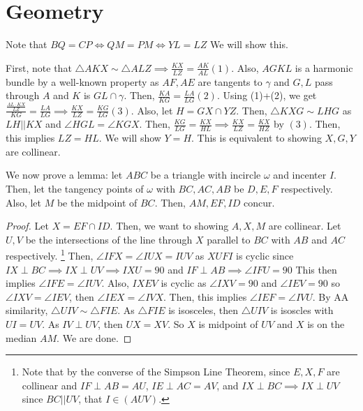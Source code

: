 \documentclass[11pt]{article}
\begin{document}

\setcounter{problem}{0}
\section{Geometry}


\begin{sol} Note that $BQ=CP \iff QM = PM \iff YL = LZ$ We will show this.

First, note that $\triangle AKX \sim \triangle ALZ\implies \frac{KX}{LZ} = \frac{AK}{AL} (1)$. Also, $AGKL$ is a harmonic bundle by a well-known property as $AF, AE$ are tangents to $\gamma$ and $G,L$ pass through $A$ and $K$ is $GL \cap \gamma$. Then, $\frac{KA}{KG} = \frac{LA}{LG}(2)$. Using (1)+(2), we get $\frac{\frac{AL\cdot KX}{LZ}}{KG} = \frac{LA}{LG} \implies \frac{KX}{LZ} = \frac{KG}{LG}(3)$. Also, let $H=GX \cap YZ$. Then, $\triangle KXG \sim LHG$ as $LH||KX$ and $\angle HGL = \angle KGX$. Then, $\frac{KG}{LG}=\frac{KX}{HL} \implies \frac{KX}{LZ } = \frac{KX}{HZ}$ by $(3)$. Then, this implies $LZ=HL$. We will show $Y=H$. This is equivalent to showing $X,G,Y$ are collinear.

We now prove a lemma: let $ABC$ be a triangle with incircle $\omega$ and incenter $I$. Then, let the tangency points of $\omega$ with $BC,AC,AB$ be $D,E,F$ respectively. Also, let $M$ be the midpoint of $BC$. Then, $AM, EF, ID$ concur.

\begin{proof}
Let $X=EF \cap ID$. Then, we want to showing $A,X,M$ are collinear. Let $U,V$ be the intersections of the line through $X$ parallel to $BC$ with $AB$ and $AC$ respectively. \footnote{Note that by the converse of the Simpson Line Theorem, since $E,X,F$ are collinear and $IF \perp AB = AU$, $IE \perp AC = AV $, and $IX\perp BC\implies IX\perp UV$ since $BC||UV$, that $I\in (AUV)$.} Then, $\angle IFX = \angle IUX = IUV$ as $XUFI$ is cyclic since $IX\perp BC\implies IX\perp UV\implies IXU = 90$ and $IF\perp AB\implies \angle IFU =90$ This then implies $\angle IFE = \angle IUV$. Also, $IXEV$ is cyclic as $\angle IXV=90$ and $\angle IEV=90$ so $\angle IXV= \angle IEV$, then $\angle IEX=\angle IVX$. Then, this implies $\angle IEF = \angle IVU$. By AA similarity, $\triangle UIV \sim \triangle FIE$. As $\triangle FIE$ is isosceles, then $\triangle UIV$ is isoscles with $UI=UV$. As $IV \perp UV$, then $UX=XV$. So $X$ is midpoint of $UV$ and $X$ is on the median $AM$. We are done.
\end{proof}


\end{sol}
\end{document}

